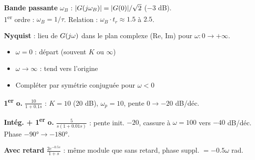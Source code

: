 \begin{tcolorbox}[colback=ch4purple!5,colframe=ch4purple!80!black,title={Bande passante \& Nyquist (rappel)}]
\textbf{Bande passante} $\omega_B$ : $|G(j\omega_B)| = |G(0)|/\sqrt{2}$ ($-3$ dB).\\
1\textsuperscript{er} ordre : $\omega_B = 1/\tau$. Relation : $\omega_B \cdot t_r \approx 1.5$ \`a $2.5$.

\textbf{Nyquist} : lieu de $G(j\omega)$ dans le plan complexe (Re, Im) pour $\omega : 0 \to +\infty$.
\begin{itemize}
  \item $\omega{=}0$ : d\'epart (souvent $K$ ou $\infty$)
  \item $\omega \to \infty$ : tend vers l'origine
  \item Compl\'eter par sym\'etrie conjugu\'ee pour $\omega < 0$
\end{itemize}
\end{tcolorbox}

\begin{tcolorbox}[colback=ch4purple!5,colframe=ch4purple!80!black,title={Exemples de Bode classiques}]
\textbf{1\textsuperscript{er} o.} $\frac{10}{1{+}0.1s}$ : $K{=}10$ (20 dB), $\omega_p{=}10$, pente $0 \to -20$ dB/d\'ec.

\textbf{Intég. + 1\textsuperscript{er} o.} $\frac{5}{s(1{+}0.01s)}$ : pente init. $-20$, cassure \`a $\omega{=}100$ vers $-40$ dB/d\'ec. Phase $-90° \to -180°$.

\textbf{Avec retard} $\frac{2e^{-0.5s}}{1{+}s}$ : m\^eme module que sans retard, phase suppl. $= -0.5\omega$ rad.
\end{tcolorbox}
